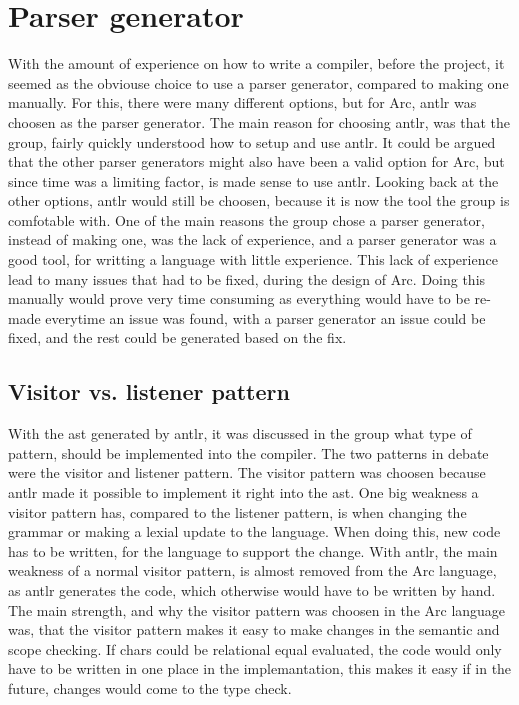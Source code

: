 
\section{Parser generator}
With the amount of experience on how to write a compiler, before the project, it seemed as the obviouse choice to use a parser generator, compared to making one manually. For this, there were many different options, but for Arc, \gls{antlr} was choosen as the parser generator. The main reason for choosing \gls{antlr}, was that the group, fairly quickly understood how to setup and use \gls{antlr}. It could be argued that the other parser generators might also have been a valid option for Arc, but since time was a limiting factor, is made sense to use \gls{antlr}. Looking back at the other options, \gls{antlr} would still be choosen, because it is now the tool the group is comfotable with. One of the main reasons the group chose a parser generator, instead of making one, was the lack of experience, and a parser generator was a good tool, for writting a language with little experience. This lack of experience lead to many issues that had to be fixed, during the design of Arc. Doing this manually would prove very time consuming as everything would have to be re-made everytime an issue was found, with a parser generator an issue could be fixed, and the rest could be generated based on the fix.

\subsection{Visitor vs. listener pattern}
With the \gls{ast} generated by \gls{antlr}, it was discussed in the group what type of pattern, should be implemented into the compiler. The two patterns in debate were the visitor and listener pattern. The visitor pattern was choosen because \gls{antlr} made it possible to implement it right into the \gls{ast}. One big weakness a visitor pattern has, compared to the listener pattern, is when changing the grammar or making a lexial update to the language. When doing this, new code has to be written, for the language to support the change. With \gls{antlr}, the main weakness of a normal visitor pattern, is almost removed from the Arc language, as \gls{antlr} generates the code, which otherwise would have to be written by hand. The main strength, and why the visitor pattern was choosen in the Arc language was, that the visitor pattern makes it easy to make changes in the semantic and scope checking. If chars could be relational equal evaluated, the code would only have to be written in one place in the implemantation, this makes it easy if in the future, changes would come to the type check. 

